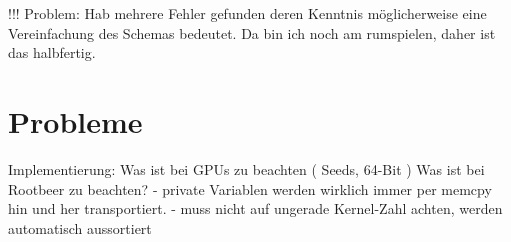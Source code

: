 !!! Problem: Hab mehrere Fehler gefunden deren Kenntnis möglicherweise eine Vereinfachung des Schemas bedeutet. Da bin ich noch am rumspielen, daher ist das halbfertig.

\section{Probleme}
Implementierung:
    Was ist bei GPUs zu beachten ( Seeds, 64-Bit )
    Was ist bei Rootbeer zu beachten?
      - private Variablen werden wirklich immer per memcpy hin und her transportiert.
      - muss nicht auf ungerade Kernel-Zahl achten, werden automatisch aussortiert
